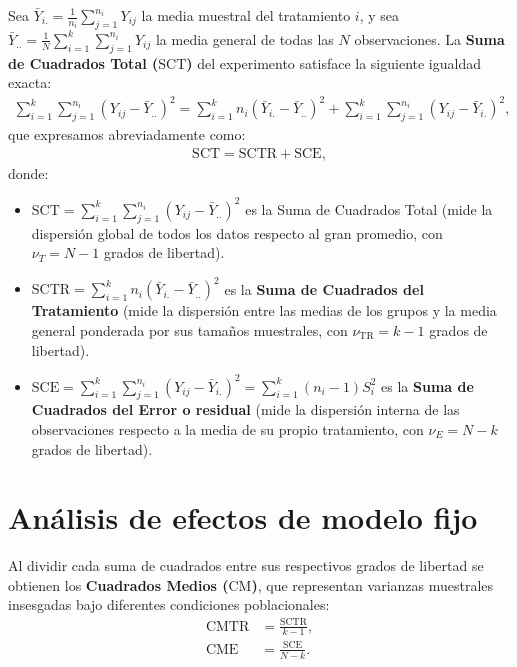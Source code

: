 \begin{teorema}
	Sea $\bar{Y}_{i.} = \frac{1}{n_i}\sum_{j=1}^{n_i} Y_{ij}$ la media muestral del tratamiento $i$, y sea $\bar{Y}_{..} = \frac{1}{N}\sum_{i=1}^k \sum_{j=1}^{n_i} Y_{ij}$ la media general de todas las $N$ observaciones. La \textbf{Suma de Cuadrados Total ($\text{SCT}$)} del experimento satisface la siguiente igualdad exacta:
	\begin{align}
		\sum_{i=1}^k \sum_{j=1}^{n_i} (Y_{ij} - \bar{Y}_{..})^2 = \sum_{i=1}^k n_i (\bar{Y}_{i.} - \bar{Y}_{..})^2 + \sum_{i=1}^k \sum_{j=1}^{n_i} (Y_{ij} - \bar{Y}_{i.})^2,
		\label{eq:particion_suma_cuadrados}
	\end{align}
	que expresamos abreviadamente como:
	\begin{align}
		\text{SCT} = \text{SCTR} + \text{SCE},
	\end{align}
	donde:
	\begin{itemize}
		\item $\text{SCT} = \sum_{i=1}^k \sum_{j=1}^{n_i} (Y_{ij} - \bar{Y}_{..})^2$ es la Suma de Cuadrados Total (mide la dispersión global de todos los datos respecto al gran promedio, con $\nu_T = N - 1$ grados de libertad).
		\item $\text{SCTR} = \sum_{i=1}^k n_i (\bar{Y}_{i.} - \bar{Y}_{..})^2$ es la \textbf{Suma de Cuadrados del Tratamiento} (mide la dispersión entre las medias de los grupos y la media general ponderada por sus tamaños muestrales, con $\nu_{\text{TR}} = k - 1$ grados de libertad).
		\item $\text{SCE} = \sum_{i=1}^k \sum_{j=1}^{n_i} (Y_{ij} - \bar{Y}_{i.})^2 = \sum_{i=1}^k (n_i - 1) S_i^2$ es la \textbf{Suma de Cuadrados del Error o residual} (mide la dispersión interna de las observaciones respecto a la media de su propio tratamiento, con $\nu_E = N - k$ grados de libertad).
	\end{itemize}
\end{teorema}

\section{Análisis de efectos de modelo fijo}

Al dividir cada suma de cuadrados entre sus respectivos grados de libertad se obtienen los \textbf{Cuadrados Medios ($\text{CM}$)}, que representan varianzas muestrales insesgadas bajo diferentes condiciones poblacionales:
\begin{align}
	\text{CMTR} &= \frac{\text{SCTR}}{k - 1}, \\
	\text{CME} &= \frac{\text{SCE}}{N - k}.
\end{align}


